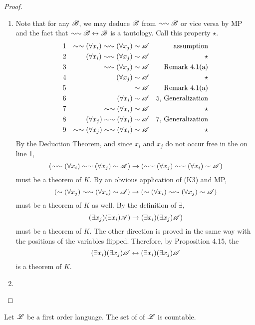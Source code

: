 \begin{proposition}
\begin{proof}
\begin{enumerate}
      \item Note that for any \wf{} \(\mathscr{B}\), we may deduce \(\mathscr{B}\) from \(\sim\sim\mathscr{B}\) or vice versa by MP and the fact that \(\sim\sim\mathscr{B} \leftrightarrow \mathscr{B}\) is a tautology. Call this property \(\star\).
        \begin{align*}
          \text{1}&&
          \sim\sim(\forall x_i)\sim\sim(\forall x_j)\sim\mathscr{A}&&
          \text{assumption}\\
          \text{2}&&
          (\forall x_i)\sim\sim(\forall x_j)\sim\mathscr{A}&&
          \text{\(\star\)}\\
          \text{3}&&
          \sim\sim(\forall x_j)\sim\mathscr{A}&&
          \text{Remark 4.1(a)}\\
          \text{4}&&
          (\forall x_j)\sim\mathscr{A}&&
          \text{\(\star\)}\\
          \text{5}&&
          \sim\mathscr{A}&&
          \text{Remark 4.1(a)}\\
          \text{6}&&
          (\forall x_i)\sim\mathscr{A}&&
          \text{5, Generalization}\\
          \text{7}&&
          \sim\sim(\forall x_i)\sim\mathscr{A}&&
          \text{\(\star\)}\\
          \text{8}&&
          (\forall x_j)\sim\sim(\forall x_i)\sim\mathscr{A}&&
          \text{7, Generalization}\\
          \text{9}&&
          \sim\sim(\forall x_j)\sim\sim(\forall x_i)\sim\mathscr{A}&&
          \text{\(\star\)}\\
        \end{align*}
        By the Deduction Theorem, and since \(x_i\) and \(x_j\) do not occur free in the \wf{} on line 1, 
        \[(\sim\sim(\forall x_i)\sim\sim(\forall x_j)\sim\mathscr{A}) \rightarrow (\sim\sim(\forall x_j)\sim\sim(\forall x_i)\sim\mathscr{A})\]
        must be a theorem of \(K\). By an obvious application of (K3) and MP,
        \[(\sim(\forall x_j)\sim\sim(\forall x_i)\sim\mathscr{A}) \rightarrow (\sim(\forall x_i)\sim\sim(\forall x_j)\sim\mathscr{A})\]
        must be a theorem of \(K\) as well. By the definition of \(\exists\),
        \[(\exists x_j)(\exists x_i)\mathscr{A}) \rightarrow (\exists x_i)(\exists x_j)\mathscr{A})\]
        must be a theorem of \(K\). The other direction is proved in the same way with the positions of the variables flipped. Therefore, by Proposition 4.15, the \wf{} 
        \[(\exists x_i)(\exists x_j)\mathscr{A} \leftrightarrow (\exists x_i)(\exists x_j)\mathscr{A}\]
        is a theorem of \(K\).

      \item %
    \end{enumerate}
  \end{proof}
\end{proposition}

\begin{proposition}
  Let \(\mathscr{L}\) be a first order language. The set of \wfs{} of \(\mathscr{L}\) is countable.
\end{proposition}
